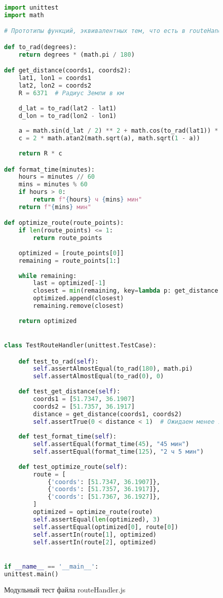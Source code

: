 \begin{figure}[H]
\begin{lstlisting}[language=Python]
import unittest
import math

# Прототипы функций, эквивалентных тем, что есть в routeHandler.js

def to_rad(degrees):
	return degrees * (math.pi / 180)

def get_distance(coords1, coords2):
	lat1, lon1 = coords1
	lat2, lon2 = coords2
	R = 6371  # Радиус Земли в км
	
	d_lat = to_rad(lat2 - lat1)
	d_lon = to_rad(lon2 - lon1)
	
	a = math.sin(d_lat / 2) ** 2 + math.cos(to_rad(lat1)) * math.cos(to_rad(lat2)) * math.sin(d_lon / 2) ** 2
	c = 2 * math.atan2(math.sqrt(a), math.sqrt(1 - a))
	
	return R * c

def format_time(minutes):
	hours = minutes // 60
	mins = minutes % 60
	if hours > 0:
		return f"{hours} ч {mins} мин"
	return f"{mins} мин"

def optimize_route(route_points):
	if len(route_points) <= 1:
		return route_points
	
	optimized = [route_points[0]]
	remaining = route_points[1:]
	
	while remaining:
		last = optimized[-1]
		closest = min(remaining, key=lambda p: get_distance(last['coords'], p['coords']))
		optimized.append(closest)
		remaining.remove(closest)
	
	return optimized


class TestRouteHandler(unittest.TestCase):

	def test_to_rad(self):
		self.assertAlmostEqual(to_rad(180), math.pi)
		self.assertAlmostEqual(to_rad(0), 0)
	
	def test_get_distance(self):
		coords1 = [51.7347, 36.1907]
		coords2 = [51.7357, 36.1917]
		distance = get_distance(coords1, coords2)
		self.assertTrue(0 < distance < 1)  # Ожидаем менее 1 км
	
	def test_format_time(self):
		self.assertEqual(format_time(45), "45 мин")
		self.assertEqual(format_time(125), "2 ч 5 мин")
	
	def test_optimize_route(self):
		route = [
			{'coords': [51.7347, 36.1907]},
			{'coords': [51.7357, 36.1917]},
			{'coords': [51.7367, 36.1927]},
		]
		optimized = optimize_route(route)
		self.assertEqual(len(optimized), 3)
		self.assertEqual(optimized[0], route[0])
		self.assertIn(route[1], optimized)
		self.assertIn(route[2], optimized)


if __name__ == '__main__':
unittest.main()

\end{lstlisting}  
\caption{Модульный тест файла routeHandler.js}
\label{unitUser:rimage}
\end{figure}

